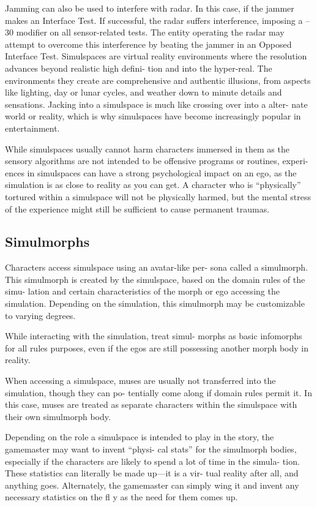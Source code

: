 Jamming can also be used to interfere with radar. In 
this case, if the jammer makes an Interface Test. If 
successful, the radar suffers interference, imposing 
a –30 modifier on all sensor-related tests. The entity 
operating the radar may attempt to overcome this 
interference by beating the jammer in an Opposed 
Interface Test.
Simulspaces are virtual reality environments where 
the resolution advances beyond realistic high defini-
tion and into the hyper-real. The environments they 
create are comprehensive and authentic illusions, from 
aspects like lighting, day or lunar cycles, and weather 
down to minute details and sensations. Jacking into 
a simulspace is much like crossing over into a alter-
nate world or reality, which is why simulspaces have 
become increasingly popular in entertainment.

While simulspaces usually cannot harm characters 
immersed in them as the sensory algorithms are not 
intended to be offensive programs or routines, experi-
ences in simulspaces can have a strong psychological 
impact on an ego, as the simulation is as close to 
reality as you can get. A character who is ``physically'' 
tortured within a simulspace will not be physically 
harmed, but the mental stress of the experience might 
still be sufficient to cause permanent traumas.

\subsection{Simulmorphs}

Characters access simulspace using an avatar-like per-
sona called a simulmorph. This simulmorph is created by 
the simulspace, based on the domain rules of the simu-
lation and certain characteristics of the morph or ego 
accessing the simulation. Depending on the simulation, 
this simulmorph may be customizable to varying degrees.

While interacting with the simulation, treat simul-
morphs as basic infomorphs for all rules purposes, 
even if the egos are still possessing another morph 
body in reality.

When accessing a simulspace, muses are usually not 
transferred into the simulation, though they can po-
tentially come along if domain rules permit it. In this 
case, muses are treated as separate characters within 
the simulspace with their own simulmorph body.

Depending on the role a simulspace is intended to play 
in the story, the gamemaster may want to invent ``physi-
cal stats'' for the simulmorph bodies, especially if the 
characters are likely to spend a lot of time in the simula-
tion. These statistics can literally be made up—it is a vir-
tual reality after all, and anything goes. Alternately, the 
gamemaster can simply wing it and invent any necessary 
statistics on the fl y as the need for them comes up.

